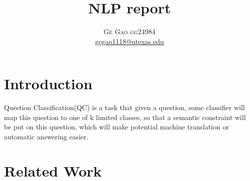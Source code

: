 \documentclass[twoside]{article}
\title{\vspace{-15mm}\fontsize{20pt}{10pt}\selectfont\textbf{NLP report}} %
\author{
\large
\textsc{Ge Gao  gg24984}\\[2mm] %
\normalsize \href{mailto:gegao1118@utexas.edu}{gegao1118@utexas.edu}
\vspace{-5mm}
}
\date{}
\begin{document}
\maketitle %



\begin{multicols}{2} %


\section{Introduction}
Question Classification(QC) is a task that given a question, some classifier will map this question to one of k limited classes, so that a semantic constraint will be put on this question, which will make potential machine translation or automatic answering easier.  


\section{Related Work}

\end{multicols}
\end{document}
